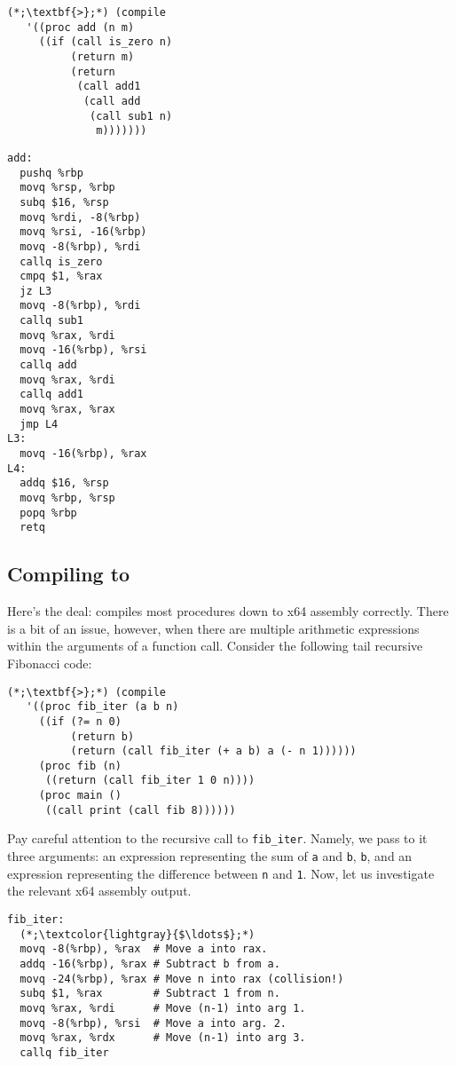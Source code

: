 \begin{cloast}[]{}
\begin{lstlisting}[language=MySOutput]
(*;\textbf{>};*) (compile 
   '((proc add (n m)
     ((if (call is_zero n)
          (return m)
          (return 
           (call add1 
            (call add 
             (call sub1 n) 
              m)))))))
\end{lstlisting}
\tcblower
\begin{lstlisting}[language=MyNLNAssembly]
add:
  pushq %rbp
  movq %rsp, %rbp
  subq $16, %rsp
  movq %rdi, -8(%rbp)
  movq %rsi, -16(%rbp)
  movq -8(%rbp), %rdi
  callq is_zero
  cmpq $1, %rax
  jz L3
  movq -8(%rbp), %rdi
  callq sub1
  movq %rax, %rdi
  movq -16(%rbp), %rsi
  callq add
  movq %rax, %rdi
  callq add1
  movq %rax, %rax
  jmp L4
L3:
  movq -16(%rbp), %rax
L4:
  addq $16, %rsp
  movq %rbp, %rsp
  popq %rbp
  retq
\end{lstlisting}
\end{cloast}

\subsection*{Compiling  to }

Here's the deal:  compiles most procedures down to x64 assembly correctly. There is a bit of an issue, however, when there are multiple arithmetic expressions within the arguments of a function call. Consider the following tail recursive Fibonacci code:

\begin{cl}[]{}\begin{lstlisting}[language=MySOutput]
(*;\textbf{>};*) (compile 
   '((proc fib_iter (a b n)
     ((if (?= n 0)
          (return b)
          (return (call fib_iter (+ a b) a (- n 1))))))
     (proc fib (n)
      ((return (call fib_iter 1 0 n))))
     (proc main ()
      ((call print (call fib 8))))))
\end{lstlisting}\end{cl}

Pay careful attention to the recursive call to \texttt{fib\_iter}. Namely, we pass to it three arguments: an expression representing the sum of \texttt{a} and \texttt{b}, \texttt{b}, and an expression representing the difference between \texttt{n} and \texttt{1}. Now, let us investigate the relevant x64 assembly output.

\begin{cl}[]{}
\begin{lstlisting}[language=MyAssembly]
fib_iter:
  (*;\textcolor{lightgray}{$\ldots$};*)
  movq -8(%rbp), %rax  # Move a into rax.
  addq -16(%rbp), %rax # Subtract b from a.
  movq -24(%rbp), %rax # Move n into rax (collision!)
  subq $1, %rax        # Subtract 1 from n.
  movq %rax, %rdi      # Move (n-1) into arg 1.
  movq -8(%rbp), %rsi  # Move a into arg. 2.
  movq %rax, %rdx      # Move (n-1) into arg 3.
  callq fib_iter
\end{lstlisting}
\end{cl}

